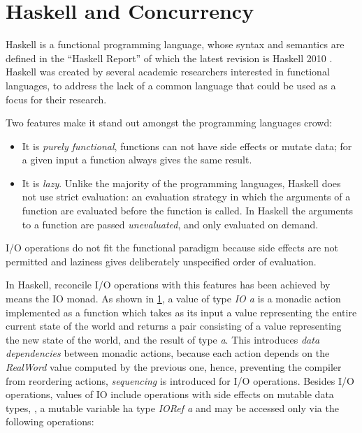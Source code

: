 
\chapter{Haskell and Concurrency}

Haskell is a functional programming language, whose syntax and semantics are defined in the ``Haskell Report'' of which the latest revision is Haskell 2010 \cite{Marlow_haskell2010}. Haskell was created by several academic researchers interested in functional languages, to address the lack of a common language that could be used as a focus for their research.

Two features make it stand out amongst the programming languages crowd:
\begin{itemize}
\item It is \emph{purely functional}, \ie functions can not have side effects or mutate data; for a given input a function always gives the same result.
\item It is \emph{lazy}. Unlike the majority of the programming languages, Haskell does not use strict evaluation: an evaluation strategy in which the arguments of a function are evaluated before the function is called. In Haskell the arguments to a function are passed \emph{unevaluated}, and only evaluated on demand.
\end{itemize}

I/O operations do not fit the functional paradigm because side effects are not permitted and laziness gives deliberately unspecified order of evaluation.

In Haskell, reconcile I/O operations with this features has been achieved by means the IO monad.\cite{PeytonJones:1993:IFP:158511.158524}
As shown in \cref{}, a value of type \emph{IO a} is a monadic action implemented as a function which takes as its input a value representing the entire current state of the world and returns a pair consisting of a value representing the new state of the world, and the result of type \emph{a}.
This introduces \emph{data dependencies} between monadic actions, because each action depends on the \emph{RealWord} value computed by the previous one, hence, preventing the compiler from reordering actions, \emph{sequencing} is introduced for I/O operations.
Besides I/O operations, values of IO include operations with side effects on mutable data types, \eg, a mutable variable ha type \emph{IORef a} and may be accessed only via the following operations:

